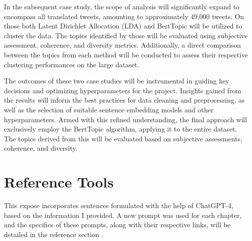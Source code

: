 \documentclass[
    11pt,
    a4paper,
    egregdoesnotlikesansseriftitles,
    toc=chapterentrywithdots,
    oneside,openright,
    titlepage,
    parskip=half,
    headings=normal,  %
    listof=totoc,
    bibliography=totoc,
    index=totoc,
    captions=tableheading,  %
    chapterprefix,
    listof=flat,
    final
]{scrbook}
\begin{document}
In the subsequent case study, the scope of analysis will significantly expand to encompass all translated tweets, amounting to approximately 49,000 tweets. On those both Latent Dirichlet Allocation (LDA) and BertTopic will be utilized to cluster the data.
The topics identified by those will be evaluated using subjective assessment, coherence, and diversity metrics. Additionally, a direct comparison between the topics from each method will be conducted to assess their respective clustering performances on the large dataset.

The outcomes of these two case studies will be instrumental in guiding key decisions and optimizing hyperparameters for the project. Insights gained from the results will inform the best practices for data cleaning and preprocessing, as well as the selection of suitable sentence embedding models and other hyperparameters. Armed with this refined understanding, the final approach will exclusively employ the BertTopic algorithm, applying it to the entire dataset.
The topics derived from this will be evaluated based on subjective assessments, coherence, and diversity.

{\let\clearpage\relax \chapter{Reference Tools}}

This expose incorporates sentences formulated with the help of ChatGPT-4, based on the information I provided. A new prompt was used for each chapter, and the specifics of these prompts, along with their respective links, will be detailed in the reference section \cite{PromptIntroduction,PromptObjective,PromptStateofResearch,PromptDataSet,PromptMethodology,PromptTechnology}.



\backmatter

\cleardoublepage



\printnoidxglossaries
  \renewcommand\bibname{References} 


\end{document}
